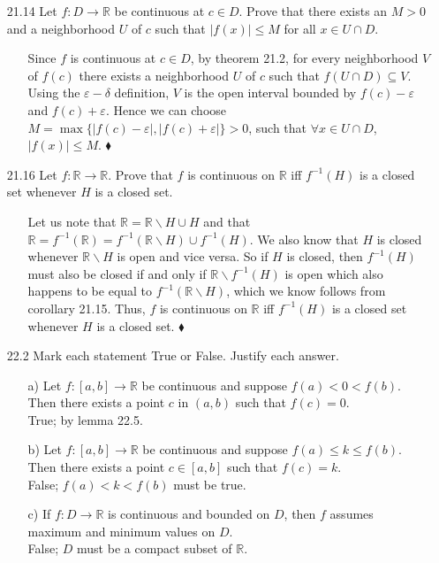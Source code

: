 \documentclass[12pt]{article}
\begin{document}
\begin{enumerate}
\begin{enumerate}
\item[21.14] Let $f: D \rightarrow \mathbb{R}$ be continuous at $c \in D$. Prove that there exists an $M > 0$ and a neighborhood $U$ of $c$ such that $|f(x)| \leq M$ for all $x \in U \cap D$.
\begin{enumerate}
\item[] Since $f$ is continuous at $c \in D$, by theorem 21.2, for every neighborhood
$V$ of $f(c)$ there exists a neighborhood $U$ of $c$ such that 
$f(U \cap D) \subseteq V$. Using the $\varepsilon - \delta$ definition, 
$V$ is the open interval bounded by $f(c) - \varepsilon$ and $f(c) + \varepsilon$. 
Hence we can choose $M = \max \{ |f(c) - \varepsilon |, |f(c) + \varepsilon |\} > 0$,
such that $\forall x \in U \cap D$, $|f(x)| \leq M$. $\blacklozenge$
\end{enumerate}

\item[21.16] Let $f: \mathbb{R} \rightarrow \mathbb{R}$. Prove that $f$ is continuous on $\mathbb{R}$ iff $f^{-1}(H)$ is a closed set whenever $H$ is a closed set.
\begin{enumerate}
\item[] Let us note that $\mathbb{R} = \mathbb{R}\backslash H \cup H$ and that
$\mathbb{R} = f^{-1}(\mathbb{R}) = f^{-1}(\mathbb{R}\backslash H) \cup f^{-1}(H)$. 
We also know that $H$ is closed whenever $\mathbb{R}\backslash H$ is open and 
vice versa. So if $H$ is closed, then $f^{-1}(H)$ must also be closed if and 
only if $\mathbb{R}\backslash f^{-1}(H)$ is open which also happens to be equal 
to $f^{-1}(\mathbb{R}\backslash H)$, which we know follows from corollary 21.15.
Thus, $f$ is continuous on $\mathbb{R}$ iff $f^{-1}(H)$ is a closed set
whenever $H$ is a closed set. $\blacklozenge$
\end{enumerate}

\item[22.2] Mark each statement True or False. Justify each answer.
\begin{enumerate}
\item[a)] Let $f : [a, b] \rightarrow \mathbb{R}$ be continuous and suppose $f(a) < 0 < f(b)$. Then there exists a point $c$ in $(a, b)$ such that $f(c) = 0$. \\
True; by lemma 22.5.
\item[b)] Let $f : [a, b] \rightarrow \mathbb{R}$ be continuous and suppose $f(a) \leq k \leq f(b)$. Then there exists a point $c \in [a, b]$ such that $f(c) = k$. \\
False; $f(a) < k < f(b)$ must be true.
\item[c)] If $f: D \rightarrow \mathbb{R}$ is continuous and bounded on $D$, then $f$ assumes maximum and minimum values on $D$. \\
False; $D$ must be a compact subset of $\mathbb{R}$.
\end{enumerate}


\end{enumerate}
\end{enumerate}
\end{document}
